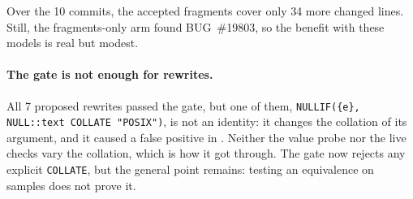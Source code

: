 Over the 10 commits, the accepted fragments cover only 34 more changed lines.
Still, the fragments-only arm found BUG~\#19803, so the benefit with these
models is real but modest.

\paragraph{The gate is not enough for rewrites.} All 7 proposed rewrites passed
the gate, but one of them, \texttt{NULLIF(\{e\}, NULL::text COLLATE "POSIX")},
is not an identity: it changes the collation of its argument, and it caused a
false positive in . Neither the value probe nor the live checks vary
the collation, which is how it got through. The gate now rejects any explicit
\texttt{COLLATE}, but the general point remains: testing an equivalence on
samples does not prove it.

